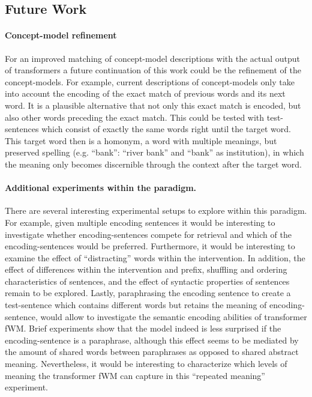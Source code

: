\subsection{Future Work}

\paragraph{Concept-model refinement} For an improved matching of concept-model descriptions with the actual output of transformers a future continuation of this work could be the refinement of the concept-models.
For example, current descriptions of concept-models only take into account the encoding of the exact match of previous words and its next word.
It is a plausible alternative that not only this exact match is encoded, but also other words preceding the exact match.
This could be tested with test-sentences which consist of exactly the same words right until the target word. This target word then is a homonym, a word with multiple meanings, but preserved spelling (e.g. ``bank'': ``river bank'' and ``bank'' as institution), in which the meaning only becomes discernible through the context after the target word.

\paragraph{Additional experiments within the paradigm.} There are several interesting experimental setups to explore within this paradigm.
For example, given multiple encoding sentences it would be interesting to investigate whether encoding-sentences compete for retrieval and which of the encoding-sentences would be preferred.
Furthermore, it would be interesting to examine the effect of ``distracting'' words within the intervention.
In addition, the effect of differences within the intervention and prefix, shuffling and ordering characteristics of sentences, and the effect of syntactic properties of sentences remain to be explored.
Lastly, paraphrasing the encoding sentence to create a test-sentence which contains different words but retains the meaning of encoding-sentence, would allow to investigate the semantic encoding abilities of transformer fWM.
Brief experiments show that the model indeed is less surprised if the encoding-sentence is a paraphrase, although this effect seems to be mediated by the amount of shared words between paraphrases as opposed to shared abstract meaning.
Nevertheless, it would be interesting to characterize which levels of meaning the transformer fWM can capture in this ``repeated meaning'' experiment.


